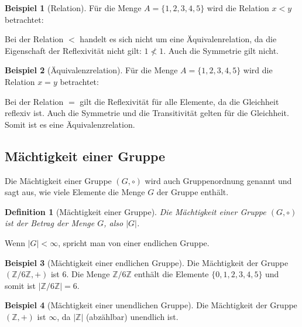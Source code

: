\documentclass[12pt,a4paper, usenames, dvipsnames]{article}
\theoremstyle{mystyle}
\newtheorem{definition}{Definition}
\theoremstyle{definition}
\newtheorem{bsp}{Beispiel}[definition]
\begin{document}
\begin{bsp}[Relation]


Für die Menge $A=\{ 1, 2, 3, 4, 5 \}$ wird die Relation $ x < y$ betrachtet:

Bei der Relation $< $ handelt es sich nicht um eine Äquivalenrelation, da die Eigenschaft der Reflexivität nicht gilt: $1 \nless 1$. Auch die Symmetrie gilt nicht.


\end{bsp}
\begin{bsp}[Äquivalenzrelation]
Für die Menge $A=\{ 1, 2, 3, 4, 5 \}$ wird die Relation $ x = y$ betrachtet:

Bei der Relation $=$ gilt die Reflexivität für alle Elemente, da die Gleichheit reflexiv ist. Auch die Symmetrie und die Transitivität gelten für die Gleichheit. Somit ist es eine Äquivalenzrelation. 


\end{bsp}

%
%
%
%
%
%
%
%
%
%
%
%
%
\subsection*{Mächtigkeit einer Gruppe} 

Die Mächtigkeit einer Gruppe $(G, \circ)$ wird auch Gruppenordnung genannt und sagt aus, wie viele Elemente die Menge $G$ der Gruppe enthält.

\begin{definition}[Mächtigkeit einer Gruppe]
Die Mächtigkeit einer Gruppe $(G, \circ)$ ist der Betrag der Menge $G$, also $|G|$. 
\end{definition}

Wenn $|G| < \infty$, spricht man von einer endlichen Gruppe.

\begin{bsp}[Mächtigkeit einer endlichen Gruppe]

Die Mächtigkeit der Gruppe $(\mathbb{Z}/6\mathbb{Z}, +)$ ist $6$. Die Menge $\mathbb{Z}/6\mathbb{Z}$ enthält die Elemente $\{0,1,2,3,4,5 \}$ und somit ist $| \mathbb{Z}/6\mathbb{Z} | = 6$.

\end{bsp}

\begin{bsp}[Mächtigkeit einer unendlichen Gruppe]

Die Mächtigkeit der Gruppe $(\mathbb{Z}, +)$ ist $\infty$, da $|\mathbb{Z}|$ (abzählbar) unendlich ist.

\end{bsp}
%
%
%
%
%
%
%
%
%
%
%
%
%
\end{document}
